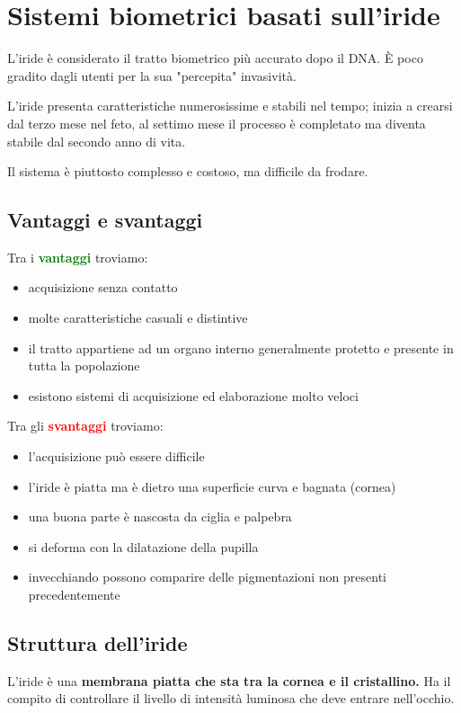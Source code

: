 \chapter{Sistemi biometrici basati sull'iride}

L'iride è considerato il tratto biometrico più accurato
dopo il DNA. È poco gradito dagli utenti per la sua
"percepita" invasività.

L'iride presenta caratteristiche numerosissime e stabili 
nel tempo; inizia a crearsi dal terzo mese nel feto, al settimo mese 
il processo è completato ma diventa stabile dal secondo anno di vita.

Il sistema è piuttosto complesso e costoso, ma difficile da frodare.

\section{Vantaggi e svantaggi}

Tra i \textbf{\textcolor{green}{vantaggi}} troviamo:
\begin{itemize}
    \item acquisizione senza contatto
    \item molte caratteristiche casuali e distintive
    \item il tratto appartiene ad un organo interno generalmente protetto e presente in tutta la popolazione
    \item esistono sistemi di acquisizione ed elaborazione molto veloci
\end{itemize}
Tra gli \textbf{\textcolor{red}{svantaggi}} troviamo:
\begin{itemize}
    \item l'acquisizione può essere difficile 
    \item l'iride è piatta ma è dietro una superficie curva e bagnata (cornea)
    \item una buona parte è nascosta da ciglia e palpebra
    \item si deforma con la dilatazione della pupilla
    \item invecchiando possono comparire delle pigmentazioni non presenti
    precedentemente
\end{itemize}

\section{Struttura dell'iride}
L'iride è una \textbf{membrana piatta che sta tra la cornea e il cristallino.}
Ha il compito di controllare il livello di intensità luminosa che deve entrare nell'occhio.

